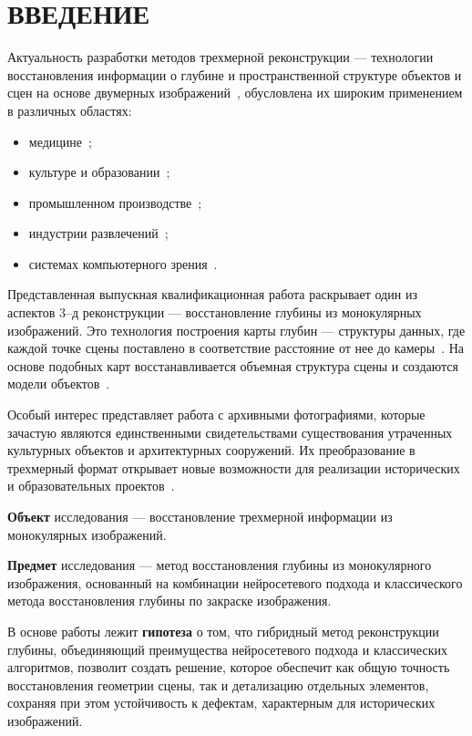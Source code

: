 \chapter*{ВВЕДЕНИЕ}

Актуальность разработки методов трехмерной реконструкции --- технологии восстановления информации о глубине и пространственной структуре объектов и сцен на основе двумерных изображений~\cite{stereosop2},
обусловлена их широким применением в различных областях:

\begin{itemize}
    \item медицине~\cite{kt, med2, med3};
    \item культуре и образовании~\cite{kult1, kult2};
    \item промышленном производстве~\cite{prom1, prom2, prom3};
    \item индустрии развлечений~\cite{play1, play2, play3};
    \item системах компьютерного зрения~\cite{vis1, vis2, vis3}.
\end{itemize}

Представленная выпускная квалификационная работа раскрывает один из аспектов 3--д реконструкции --- восстановление глубины из монокулярных изображений.
Это технология построения карты глубин --- структуры данных,
где каждой точке сцены поставлено в соответствие расстояние от нее до камеры~\cite{stereosop2}.
На основе подобных карт восстанавливается объемная структура сцены и создаются модели объектов~\cite{stereosop2, prom2, play1}.

Особый интерес представляет работа с архивными фотографиями,
которые зачастую являются единственными свидетельствами существования утраченных культурных объектов и архитектурных сооружений.
Их преобразование в трехмерный формат открывает новые возможности для реализации исторических и образовательных проектов~\cite{ kult1, kult2, kult3}.

\textbf{Объект} исследования --- восстановление трехмерной информации из монокулярных изображений.

\textbf{Предмет} исследования --- метод восстановления глубины из монокулярного изображения,
основанный на комбинации нейросетевого подхода и классического метода восстановления глубины по закраске изображения.

В основе работы лежит \textbf{гипотеза} о том, что гибридный метод реконструкции глубины,
объединяющий преимущества нейросетевого подхода и классических алгоритмов, позволит создать решение,
которое обеспечит как общую точность восстановления геометрии сцены, так и детализацию отдельных элементов,
сохраняя при этом устойчивость к дефектам, характерным для исторических изображений.

